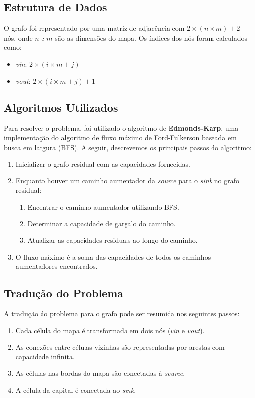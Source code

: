 \documentclass[a4paper,12pt]{article}
\begin{document}
\subsection*{Estrutura de Dados}

O grafo foi representado por uma matriz de adjacência com $2 \times (n \times m) + 2$ nós, onde $n$ e $m$ são as dimensões do mapa. Os índices dos nós foram calculados como:
\begin{itemize}
    \item \textit{vin}: $2 \times (i \times m + j)$
    \item \textit{vout}: $2 \times (i \times m + j) + 1$
\end{itemize}

\subsection*{Algoritmos Utilizados}

Para resolver o problema, foi utilizado o algoritmo de \textbf{Edmonds-Karp},
uma implementação do algoritmo de fluxo máximo de Ford-Fulkerson baseada em
busca em largura (BFS). A seguir, descrevemos os principais passos do
algoritmo:

\begin{enumerate}
    \item Inicializar o grafo residual com as capacidades fornecidas.
    \item Enquanto houver um caminho aumentador da \textit{source} para o \textit{sink}
          no grafo residual:
          \begin{enumerate}
              \item Encontrar o caminho aumentador utilizando BFS.
              \item Determinar a capacidade de gargalo do caminho.
              \item Atualizar as capacidades residuais ao longo do caminho.
          \end{enumerate}
    \item O fluxo máximo é a soma das capacidades de todos os caminhos aumentadores
          encontrados.
\end{enumerate}

\subsection*{Tradução do Problema}

A tradução do problema para o grafo pode ser resumida nos seguintes passos:
\begin{enumerate}
    \item Cada célula do mapa é transformada em dois nós (\textit{vin} e \textit{vout}).
    \item As conexões entre células vizinhas são representadas por arestas com capacidade
          infinita.
    \item As células nas bordas do mapa são conectadas à \textit{source}.
    \item A célula da capital é conectada ao \textit{sink}.
\end{enumerate}
\end{document}
